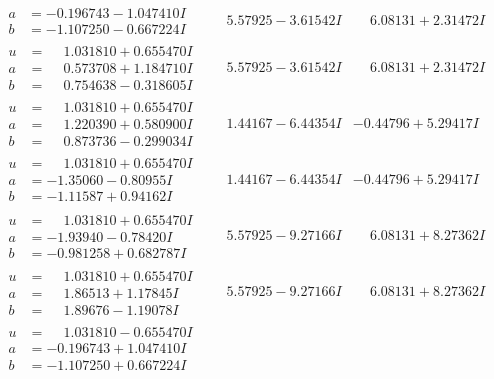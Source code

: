 \documentclass[1p]{elsarticle_modified}
\theoremstyle{definition}
\begin{document}
$$\begin{array}{c|c|c}
\begin{aligned}
a &= -0.196743 - 1.047410 I \\
b &= -1.107250 - 0.667224 I\end{aligned}
 & \phantom{-}5.57925 - 3.61542 I & \phantom{-}6.08131 + 2.31472 I \\ \hline\begin{aligned}
u &= \phantom{-}1.031810 + 0.655470 I \\
a &= \phantom{-}0.573708 + 1.184710 I \\
b &= \phantom{-}0.754638 - 0.318605 I\end{aligned}
 & \phantom{-}5.57925 - 3.61542 I & \phantom{-}6.08131 + 2.31472 I \\ \hline\begin{aligned}
u &= \phantom{-}1.031810 + 0.655470 I \\
a &= \phantom{-}1.220390 + 0.580900 I \\
b &= \phantom{-}0.873736 - 0.299034 I\end{aligned}
 & \phantom{-}1.44167 - 6.44354 I & -0.44796 + 5.29417 I \\ \hline\begin{aligned}
u &= \phantom{-}1.031810 + 0.655470 I \\
a &= -1.35060 - 0.80955 I \\
b &= -1.11587 + 0.94162 I\end{aligned}
 & \phantom{-}1.44167 - 6.44354 I & -0.44796 + 5.29417 I \\ \hline\begin{aligned}
u &= \phantom{-}1.031810 + 0.655470 I \\
a &= -1.93940 - 0.78420 I \\
b &= -0.981258 + 0.682787 I\end{aligned}
 & \phantom{-}5.57925 - 9.27166 I & \phantom{-}6.08131 + 8.27362 I \\ \hline\begin{aligned}
u &= \phantom{-}1.031810 + 0.655470 I \\
a &= \phantom{-}1.86513 + 1.17845 I \\
b &= \phantom{-}1.89676 - 1.19078 I\end{aligned}
 & \phantom{-}5.57925 - 9.27166 I & \phantom{-}6.08131 + 8.27362 I \\ \hline\begin{aligned}
u &= \phantom{-}1.031810 - 0.655470 I \\
a &= -0.196743 + 1.047410 I \\
b &= -1.107250 + 0.667224 I\end{aligned}

\end{array}$$
\end{document}
